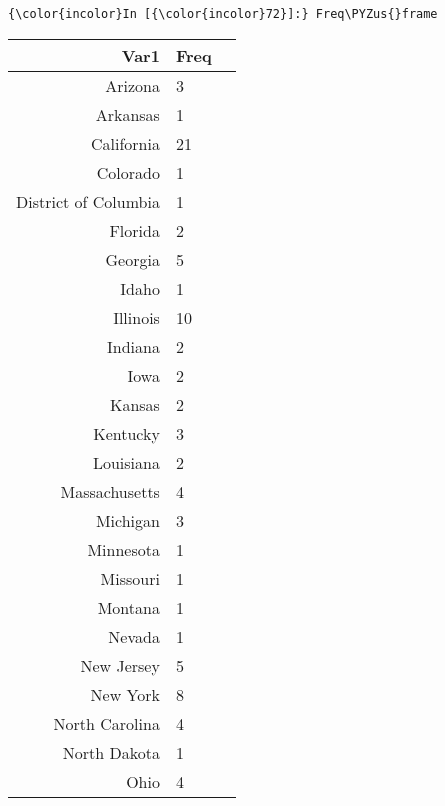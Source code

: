 \documentclass[11pt]{article}
\def\PYZus{\char`\_}
\begin{document}
    \begin{Verbatim}[commandchars=\\\{\}]
{\color{incolor}In [{\color{incolor}72}]:} Freq\PYZus{}frame
\end{Verbatim}


    \begin{tabular}{r|ll}
 Var1 & Freq\\
\hline
	 Arizona              &  3                  \\
	 Arkansas             &  1                  \\
	 California           & 21                  \\
	 Colorado             &  1                  \\
	 District of Columbia &  1                  \\
	 Florida              &  2                  \\
	 Georgia              &  5                  \\
	 Idaho                &  1                  \\
	 Illinois             & 10                  \\
	 Indiana              &  2                  \\
	 Iowa                 &  2                  \\
	 Kansas               &  2                  \\
	 Kentucky             &  3                  \\
	 Louisiana            &  2                  \\
	 Massachusetts        &  4                  \\
	 Michigan             &  3                  \\
	 Minnesota            &  1                  \\
	 Missouri             &  1                  \\
	 Montana              &  1                  \\
	 Nevada               &  1                  \\
	 New Jersey           &  5                  \\
	 New York             &  8                  \\
	 North Carolina       &  4                  \\
	 North Dakota         &  1                  \\
	 Ohio                 &  4                  \\

\end{tabular}
\end{document}

